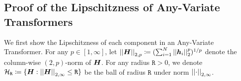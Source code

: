 

\clearpage


\subsection{Proof of the Lipschitzness of Any-Variate Transformers}\label{proof:tr-lipschitz}

We first show the Lipschitzness of each component in an Any-Variate Transformer.
For any $p \in [1, \infty]$, let $\left\lvert \left\lvert\bm{H}\right\rvert \right\rvert_{2,p} \coloneqq ( \sum_{i=1}^N \left\lvert \left\lvert\bm{h}_i\right\rvert \right\rvert_2^p )^{1/p}$ denote the column-wise $(2, p)$-norm of $\bm{H}$.
For any radius $\mathtt{R} > 0$, we denote 
$\mathcal{H}_{\mathtt{R}} \coloneqq \{ \bm{H} : \left\lvert \left\lvert\bm{H}\right\rvert \right\rvert_{2, \infty} \leq \mathtt{R} \} $ be the ball of radius $\mathtt{R}$ under norm $\left\lvert \left\lvert\cdot\right\rvert \right\rvert_{2, \infty}$.


